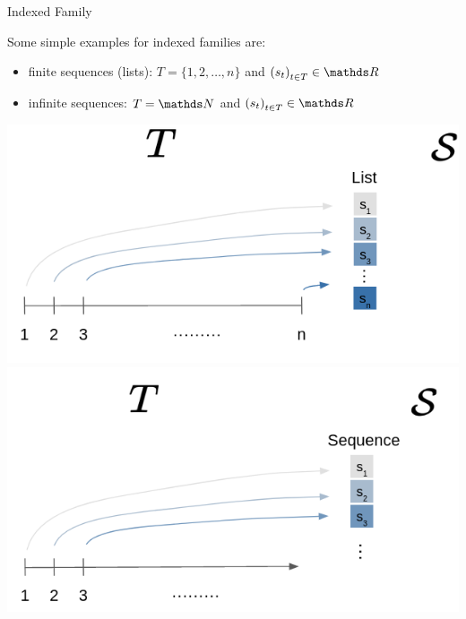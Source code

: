 \documentclass[11pt,compress,t,notes=noshow, xcolor=table]{beamer}
\begin{document}
\begin{vbframe}{Indexed Family}

Some simple examples for indexed families are:

\vspace*{0.3cm}

\begin{minipage}{0.43\linewidth}
  \begin{itemize}
  \item finite sequences (lists): $T = \{1, 2, \dots, n\}$ and $\left(s_t\right)_{t \in T} \in \R$ \vspace{1cm}
  \item infinite sequences: $T = \N$ and $\left(s_t\right)_{t \in T} \in \R$
  \end{itemize}
\end{minipage}
\begin{minipage}{0.55\linewidth}
\includegraphics{figure_man/indexed_family/indexed_family_1.png} \\
\includegraphics{figure_man/indexed_family/indexed_family_2.png}
\end{minipage}


\framebreak


\end{vbframe}
\end{document}
